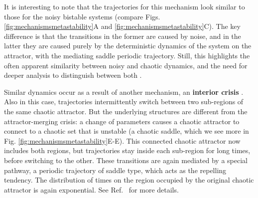 It is interesting to note that the trajectories for this mechanism look similar to those for the noisy bistable systems (compare Figs. \ref{fig:mechanismsmetastability}A and \ref{fig:mechanismsmetastability}C). The key difference is that the transitions in the former are caused by noise, and in the latter they are caused purely by the deterministic dynamics of the system on the attractor, with the mediating saddle periodic trajectory. Still, this highlights the often apparent similarity between noisy and chaotic dynamics, and the need for deeper analysis to distinguish between both \cite{boaretto2021discriminating}. 

Similar dynamics occur as a result of another mechanism, an \textbf{interior crisis} \cite{grebogi1983crises, ott2002chaos}. Also in this case, trajectories intermittently switch between two sub-regions of the same chaotic attractor. But the underlying structures are different from the attractor-merging crisis: a change of parameters causes a chaotic attractor to connect to a chaotic set that is unstable (a chaotic saddle, which we see more in Fig. \ref{fig:mechanismsmetastability}E-E\ssupprime). This connected chaotic attractor now includes both regions, but trajectories stay inside each sub-region for long times, before switching to the other. These transitions are again mediated by a special pathway, a periodic trajectory of saddle type, which acts as the repelling tendency. The distribution of times on the region occupied by the original chaotic attractor is again exponential. See Ref.~\cite{ott2002chaos} for more details.

